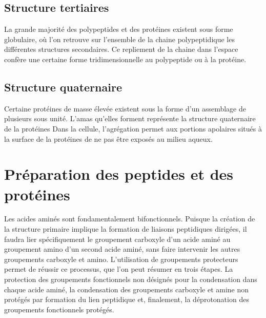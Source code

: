 \subsection{Structure tertiaires}
La grande majorité des polypeptides et des protéines existent sous forme globulaire, où l'on retrouve sur l'ensemble de la chaine polypeptidique les différentes structures secondaires.
Ce repliement de la chaine dans l'espace confère une certaine forme tridimensionnelle au polypeptide ou à la protéine.

\subsection{Structure quaternaire}
Certaine protéines de masse élevée existent sous la forme d'un assemblage de plusieurs sous unité.
L'amas qu'elles forment représente la structure quaternaire de la protéines Dans la cellule, l'agrégation permet aux portions apolaires situés à la surface de la protéines de ne pas être exposés au milieu aqueux.

\section{Préparation des peptides et des protéines}
Les acides aminés sont fondamentalement bifonctionnels.
Puisque la création de la structure primaire implique la formation de liaisons peptidiques dirigées, il faudra lier spécifiquement le groupement carboxyle d'un acide aminé au groupement amino d'un second acide aminé, sans faire intervenir les autres groupements carboxyle et amino.
L'utilisation de groupements protecteurs permet de réussir ce processus, que l'on peut résumer en trois étapes.
La protection des groupements fonctionnels non désignés pour la condensation dans chaque acide aminé, la condensation des groupements carboxyle et amine non protégés par formation du lien peptidique et, finalement, la déprotonation des groupements fonctionnels protégés.

